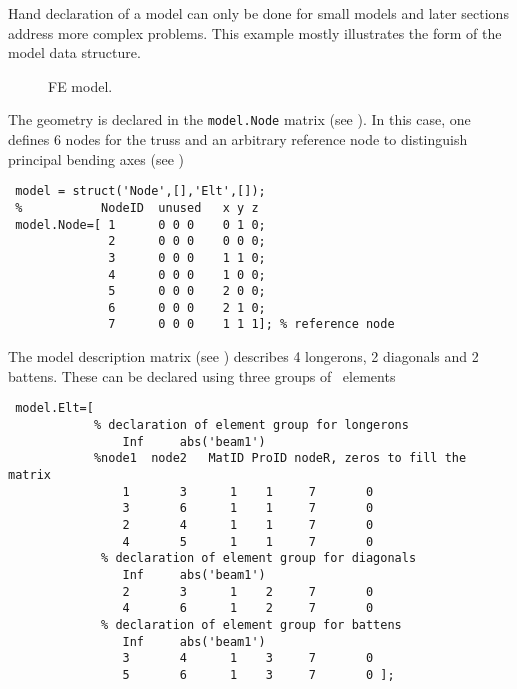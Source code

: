 \newpage

Hand declaration of a model can only be done for small models and later sections address more complex problems. This example mostly illustrates the form of the model data structure. 

\begin{figure}[H]
\centering
{} %
 \caption{FE model.}
  \label{fig:tt_2bay}
\end{figure}


The geometry is declared in the {\tt model.Node} matrix (see ). In this case, one defines 6 nodes for the truss and an arbitrary reference node to distinguish principal bending axes (see \beam)

\begin{verbatim}
 model = struct('Node',[],'Elt',[]);
 %           NodeID  unused   x y z
 model.Node=[ 1      0 0 0    0 1 0;
              2      0 0 0    0 0 0;
              3      0 0 0    1 1 0;
              4      0 0 0    1 0 0;
              5      0 0 0    2 0 0;
              6      0 0 0    2 1 0;
              7      0 0 0    1 1 1]; % reference node
\end{verbatim}

The model description matrix (see ) describes 4 longerons, 2 diagonals and 2 battens. These can be declared using three groups of \beam\ elements

\begin{verbatim}
 model.Elt=[
            % declaration of element group for longerons
                Inf     abs('beam1') 
            %node1  node2   MatID ProID nodeR, zeros to fill the matrix 
                1       3      1    1     7       0
                3       6      1    1     7       0
                2       4      1    1     7       0
                4       5      1    1     7       0
             % declaration of element group for diagonals
                Inf     abs('beam1')
                2       3      1    2     7       0
                4       6      1    2     7       0
             % declaration of element group for battens
                Inf     abs('beam1')
                3       4      1    3     7       0
                5       6      1    3     7       0 ];
\end{verbatim}

